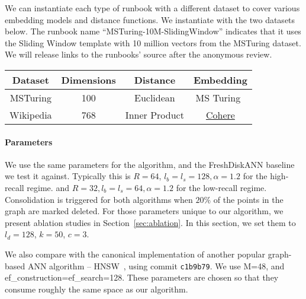 We can instantiate each type of runbook with a different dataset to cover
various embedding models and distance functions.
We instantiate with the two datasets below.
The runbook name ``MSTuring-10M-SlidingWindow''
indicates that it uses the Sliding Window template
with 10 million vectors from the MSTuring dataset.
We will release links to the runbooks' source after the anonymous review.
\begin{tabular}{c|c|c|c}
\toprule
  Dataset    & Dimensions  & Distance      & Embedding \\ \hline
  MSTuring   & 100         & Euclidean     & MS Turing~\cite{bigann21}  \\ \hline
  Wikipedia  & 768         & Inner Product & \href{https://cohere.com/embed}{Cohere} \\ \hline
\end{tabular}



\paragraph{Parameters}
We use the same parameters for the \name algorithm,
and the FreshDiskANN baseline we test it against.
Typically this is $R=64$, $l_b=l_s=128, \alpha=1.2$ for the high-recall regime.
and $R=32, l_b=l_s=64, \alpha=1.2$ for the low-recall regime. 
Consolidation is triggered for both algorithms when $20\%$ of the points in the graph are marked deleted.
For those parameters unique to our algorithm, we present ablation studies in Section~\ref{sec:ablation}.
In this section, we set them to $l_d=128$, $k=50$, $c=3$.

We also compare with the canonical implementation of
another popular graph-based ANN algorithm -- HNSW~\cite{HNSW-git}, using commit \texttt{c1b9b79}.
We use \textsf{M}=48, and \textsf{ef\_construction}=\textsf{ef\_search}=128.
These parameters are chosen so that they consume roughly the same space as our algorithm.


